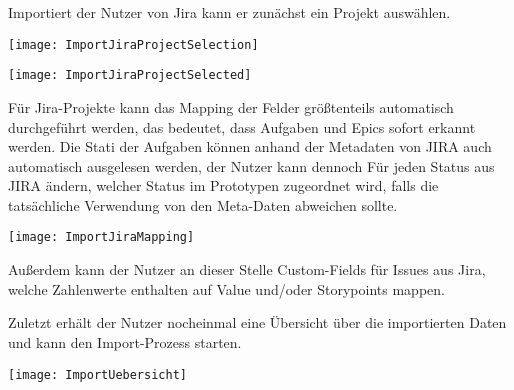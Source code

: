 Importiert der Nutzer von Jira kann er zunächst ein Projekt auswählen.

\vspace{20pt}
\begin{center}
    \begin{minipage}{1\linewidth}
        \texttt{[image: ImportJiraProjectSelection]}
    \end{minipage}
\end{center}
\vspace{20pt}

\vspace{20pt}
\begin{center}
    \begin{minipage}{1\linewidth}
        \texttt{[image: ImportJiraProjectSelected]}
    \end{minipage}
\end{center}
\vspace{20pt}

Für Jira-Projekte kann das Mapping der Felder größtenteils automatisch durchgeführt werden, das bedeutet, dass Aufgaben und Epics sofort erkannt werden. Die Stati der Aufgaben können anhand der Metadaten von JIRA auch automatisch ausgelesen werden, der Nutzer kann dennoch Für jeden Status aus JIRA ändern, welcher Status im Prototypen zugeordnet wird, falls die tatsächliche Verwendung von den Meta-Daten abweichen sollte.

\vspace{20pt}
\begin{center}
    \begin{minipage}{1\linewidth}
        \texttt{[image: ImportJiraMapping]}
    \end{minipage}
\end{center}
\vspace{20pt}

Außerdem kann der Nutzer an dieser Stelle Custom-Fields für Issues aus Jira, welche Zahlenwerte enthalten auf Value und/oder Storypoints mappen.

Zuletzt erhält der Nutzer nocheinmal eine Übersicht über die importierten Daten und kann den Import-Prozess starten.

\vspace{20pt}
\begin{center}
    \begin{minipage}{1\linewidth}
        \texttt{[image: ImportUebersicht]}
    \end{minipage}
\end{center}
\vspace{20pt}

